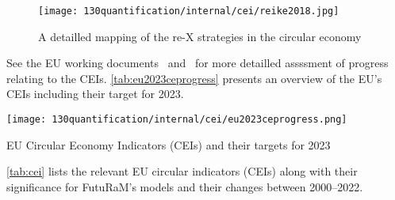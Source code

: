 \begin{figure}[h!]
    \centering
    \texttt{[image: 130quantification/internal/cei/reike2018.jpg]}
    \caption[A detailled mapping of the re-X strategies in the circular economy]{A detailled mapping of the re-X strategies in the circular economy~\cite{reike2018rex}}
    \label{fig:rex-map}
\end{figure}
\FloatBarrier


See the EU working documents~\cite{eu2018cemonitoring} and~\cite{eu2023cemonitoring} for more detailled assssment of progress relating to the CEIs. \autoref{tab:eu2023ceprogress} presents an overview of the EU's CEIs including their target for 2023.

\begin{table}[h!]
  \centering
  \texttt{[image: 130quantification/internal/cei/eu2023ceprogress.png]}
  \caption[EU Circular Economy Indicators (CEIs) and their targets for 2023]{EU Circular Economy Indicators (CEIs) and their targets for 2023~\cite{eu2023cemonitoring}}
  \label{tab:eu2023ceprogress}
\end{table}

\autoref{tab:cei} lists the relevant EU circular indicators (CEIs) along with their significance for FutuRaM's models and their changes between 2000--2022.

